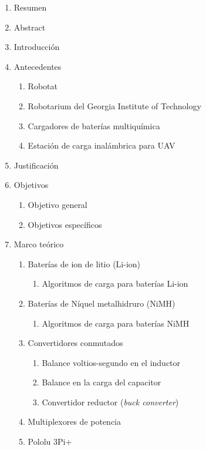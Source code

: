 \begin{enumerate}
    \item Resumen
    \item Abstract
    \item Introducción
    \item Antecedentes
    \begin{enumerate}
        \item Robotat
        \item Robotarium del Georgia Institute of Technology
        \item Cargadores de baterías multiquímica
        \item Estación de carga inalámbrica para UAV
    \end{enumerate}
    
    \item Justificación
    \item Objetivos
    \begin{enumerate}
        \item Objetivo general
        \item Objetivos específicos
    \end{enumerate}
    \item Marco teórico
    \begin{enumerate}
        \item Baterías de ion de litio (Li-ion)
        \begin{enumerate}
            \item Algoritmos de carga para baterías Li-ion
        \end{enumerate}
        \item Baterías de Níquel metalhidruro (NiMH)
        \begin{enumerate}
            \item Algoritmos de carga para baterías NiMH
        \end{enumerate}
        \item  Convertidores conmutados
        \begin{enumerate}
            \item Balance voltios-segundo en el inductor
            \item Balance en la carga del capacitor
            \item Convertidor reductor (\textit{buck converter})
        \end{enumerate}
        \item Multiplexores de potencia
        \item Pololu 3Pi+

\end{enumerate}
\end{enumerate}
